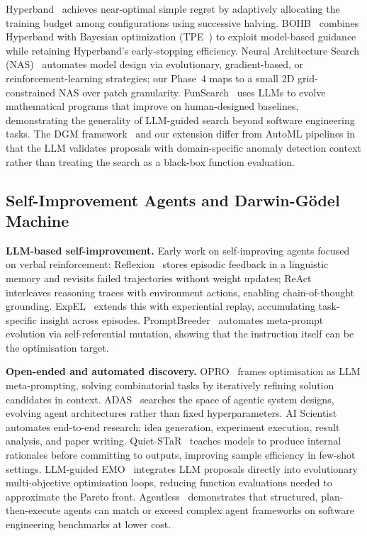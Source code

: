 ﻿\documentclass[twocolumn]{article}
\begin{document}
Hyperband~\cite{li2017hyperband} achieves near-optimal simple
regret by adaptively allocating the training budget among
configurations using successive halving.
BOHB~\cite{falkner2018bohb} combines Hyperband with
Bayesian optimization (TPE~\cite{bergstra2011algorithms}) to
exploit model-based guidance while retaining Hyperband's
early-stopping efficiency.
Neural Architecture Search (NAS)~\cite{elsken2019nas} automates
model design via evolutionary, gradient-based, or
reinforcement-learning strategies; our Phase~4 maps to a
small 2D grid-constrained NAS over patch granularity.
FunSearch~\cite{romera2023funsearch} uses LLMs to evolve
mathematical programs that improve on human-designed baselines,
demonstrating the generality of LLM-guided search beyond
software engineering tasks.
The DGM framework~\cite{liu2025dgm} and our extension differ
from AutoML pipelines in that the LLM validates proposals
with domain-specific anomaly detection context rather than
treating the search as a black-box function evaluation.

\subsection{Self-Improvement Agents and Darwin-G\"{o}del Machine}

\textbf{LLM-based self-improvement.}
Early work on self-improving agents focused on verbal reinforcement:
Reflexion~\cite{shinn2024reflexion} stores episodic feedback in a
linguistic memory and revisits failed trajectories without weight updates;
ReAct~\cite{yao2023react} interleaves reasoning traces with environment
actions, enabling chain-of-thought grounding.
ExpEL~\cite{zhao2024expel} extends this with experiential replay,
accumulating task-specific insight across episodes.
PromptBreeder~\cite{fernando2023promptbreeder} automates meta-prompt
evolution via self-referential mutation, showing that the instruction
itself can be the optimisation target.

\textbf{Open-ended and automated discovery.}
OPRO~\cite{yang2024opro} frames optimisation as LLM meta-prompting,
solving combinatorial tasks by iteratively refining solution
candidates in context.
ADAS~\cite{hu2024adas} searches the space of agentic system designs,
evolving agent architectures rather than fixed hyperparameters.
AI Scientist~\cite{lu2024ai} automates end-to-end research: idea
generation, experiment execution, result analysis, and paper writing.
Quiet-STaR~\cite{zelikman2024quiet} teaches models to produce internal
rationales before committing to outputs, improving sample efficiency
in few-shot settings.
LLM-guided EMO~\cite{nie2025llm} integrates LLM proposals directly
into evolutionary multi-objective optimisation loops, reducing
function evaluations needed to approximate the Pareto front.
Agentless~\cite{chen2024agentless} demonstrates that structured,
plan-then-execute agents can match or exceed complex agent frameworks
on software engineering benchmarks at lower cost.
\end{document}
